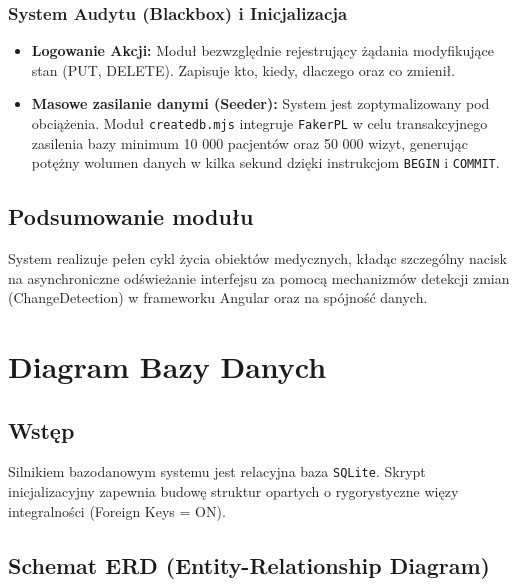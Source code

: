 \documentclass[a4paper,12pt]{report}
\begin{document}
\subsection{System Audytu (Blackbox) i Inicjalizacja}
\begin{itemize}
    \item \textbf{Logowanie Akcji:} Moduł bezwzględnie rejestrujący żądania modyfikujące stan (PUT, DELETE). Zapisuje kto, kiedy, dlaczego oraz co zmienił.
    \item \textbf{Masowe zasilanie danymi (Seeder):} System jest zoptymalizowany pod obciążenia. Moduł \texttt{createdb.mjs} integruje  \texttt{FakerPL} w celu transakcyjnego zasilenia bazy minimum 10 000 pacjentów oraz 50 000 wizyt, generując potężny wolumen danych w kilka sekund dzięki instrukcjom \texttt{BEGIN} i \texttt{COMMIT}.
\end{itemize}

\section{Podsumowanie modułu}
System realizuje pełen cykl życia obiektów medycznych, kładąc szczególny nacisk na asynchroniczne odświeżanie interfejsu za pomocą mechanizmów detekcji zmian (ChangeDetection) w frameworku Angular oraz na spójność danych.

\chapter{Diagram Bazy Danych}
\section{Wstęp}
Silnikiem bazodanowym systemu jest relacyjna baza  \texttt{SQLite}. Skrypt inicjalizacyjny zapewnia budowę struktur opartych o rygorystyczne więzy integralności (Foreign Keys = ON). 

\section{Schemat ERD (Entity-Relationship Diagram)}
\end{document}
